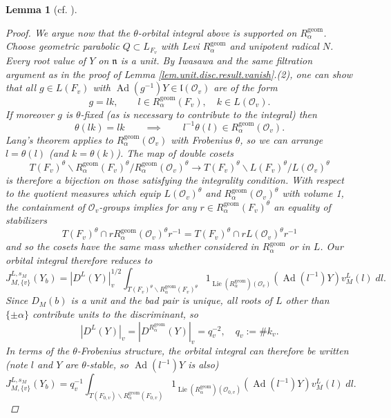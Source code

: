 \documentclass[openany]{amsbook}
\newtheorem{lemma}[theorem]{Lemma}
\theoremstyle{definition}
\theoremstyle{remark}
\numberwithin{equation}{section}
\renewcommand{\O}{\mathcal{O}}
\renewcommand{\-}{\operatorname{-}}
\newcommand{\on}[1]{\operatorname{#1}}
\newcommand{\fn}{\mathfrak{n}}
\newcommand{\fl}{\mathfrak{l}}
\newcommand{\Lie}{\on{Lie}}
\newcommand{\Ad}{\on{Ad}}
\begin{document}
\begin{lemma}[{cf. \cite[Lemme 17.6.2, Lemme 17.8.1]{CLII}}]
\begin{proof}
        We argue now that the $\theta$-orbital integral above is supported on $R_\alpha^{\on{geom}}$. Choose geometric parabolic $Q \subset L_{F_v}$ with Levi $R_\alpha^{\on{geom}}$ and unipotent radical $N$. Every root value of $Y$ on $\fn$ is a unit. By Iwasawa and the same filtration argument as in the proof of Lemma \ref{lem.unit.disc.result.vanish}.(2), one can show that all $g \in L(F_v)$ with $\Ad(g^{-1}) Y \in \fl(\O_v)$ are of the form 
        $$
            g = lk, \qquad l \in R_{\alpha}^{\on{geom}}(F_v), \quad k \in L(\O_v).
        $$
        If moreover $g$ is $\theta$-fixed (as is necessary to contribute to the integral) then
        $$
            \theta(lk) = lk \qquad \implies \qquad l^{-1} \theta(l) \in R_{\alpha}^{\on{geom}}(\O_v).
        $$
        Lang's theorem applies to $R_{\alpha}^{\on{geom}}(\O_v)$ with Frobenius $\theta$, so we can arrange $l = \theta(l)$ (and $k = \theta(k)$). 
        The map of double cosets
        $$
            T(F_v)^{\theta} \backslash R_{\alpha}^{\on{geom}}(F_v)^{\theta}/R_{\alpha}^{\on{geom}}(\O_v)^{\theta} \to T(F_v)^{\theta} \backslash L(F_v)^{\theta} / L(\O_v)^\theta
        $$
        is therefore a bijection on those satisfying the integrality condition.
        With respect to the quotient measures which equip $L(\O_v)^\theta$ and $R_{\alpha}^{\on{geom}}(\O_v)^\theta$ with volume 1, the containment of $\O_v$-groups implies for any $r \in R_\alpha^{\on{geom}}(F_v)^{\theta}$ an equality of stabilizers
        $$
            T(F_v)^{\theta} \cap r R_\alpha^{\on{geom}}(\O_v)^\theta r^{-1} = T(F_v)^{\theta} \cap r L(\O_v)^\theta r^{-1}
        $$
        and so the cosets have the same mass whether considered in $R_{\alpha}^{\on{geom}}$ or in $L$. Our orbital integral therefore reduces to
        $$
            J_{M,\{v\}}^{L, s_M}(Y_b) = |D^L(Y)|_v^{1/2} \int_{T(F_v)^{\theta} \backslash R_{\alpha}^{\on{geom}}(F_v)^{\theta}} 1_{\Lie(R_{\alpha}^{\on{geom}})(\O_v)}(\Ad(l^{-1}) Y) v_M^L(l) \; dl.
        $$
        Since $D_M(b)$ is a unit and the bad pair is unique, all roots of $L$ other than $\{\pm \alpha\}$ contribute units to the discriminant, so
        $$
            |D^L(Y)|_v = |D^{R_\alpha^{\on{geom}}}(Y)|_v = q_v^{-2}, \quad q_v := \# k_v.
        $$
        In terms of the $\theta$-Frobenius structure, the orbital integral can therefore be written (note $l$ and $Y$ are $\theta$-stable, so $\Ad(l^{-1})Y$ is also)
        $$
            J_{M,\{v\}}^{L, s_M}(Y_b) = q_v^{-1} \int_{T(F_{0,v}) \backslash R_{\alpha}^{\on{geom}}(F_{0,v})} 1_{\Lie(R_{\alpha}^{\on{geom}})(\O_{0,v})}(\Ad(l^{-1}) Y) v_M^L(l) \; dl.
        $$
        

\end{proof}
\end{lemma}
\end{document}
